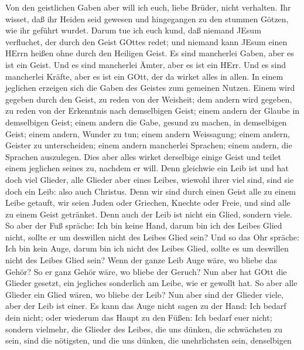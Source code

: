  Von den geistlichen Gaben aber will ich euch, liebe Brüder,
nicht verhalten.  Ihr wisset, daß ihr Heiden seid gewesen
und hingegangen zu den stummen Götzen, wie ihr geführt wurdet.
 Darum tue ich euch kund, daß niemand JEsum verfluchet, der
durch den Geist GOttes redet; und niemand kann JEsum einen HErrn heißen
ohne durch den Heiligen Geist.  Es sind mancherlei Gaben,
aber es ist ein Geist.  Und es sind mancherlei Ämter, aber
es ist ein HErr.  Und es sind mancherlei Kräfte, aber es ist
ein GOtt, der da wirket alles in allen.  In einem jeglichen
erzeigen sich die Gaben des Geistes zum gemeinen Nutzen. 
Einem wird gegeben durch den Geist, zu reden von der Weisheit; dem
andern wird gegeben, zu reden von der Erkenntnis nach demselbigen Geist;
 einem andern der Glaube in demselbigen Geist; einem andern
die Gabe, gesund zu machen, in demselbigen Geist;  einem
andern, Wunder zu tun; einem andern Weissagung; einem andern, Geister zu
unterscheiden; einem andern mancherlei Sprachen; einem andern, die
Sprachen auszulegen.  Dies aber alles wirket derselbige
einige Geist und teilet einem jeglichen seines zu, nachdem er will.
 Denn gleichwie ein Leib ist und hat doch viel Glieder,
alle Glieder aber eines Leibes, wiewohl ihrer viel sind, sind sie doch
ein Leib: also auch Christus.  Denn wir sind durch einen
Geist alle zu einem Leibe getauft, wir seien Juden oder Griechen,
Knechte oder Freie, und sind alle zu einem Geist getränket.
 Denn auch der Leib ist nicht ein Glied, sondern viele.
 So aber der Fuß spräche: Ich bin keine Hand, darum bin ich
des Leibes Glied nicht, sollte er um deswillen nicht des Leibes Glied
sein?  Und so das Ohr spräche: Ich bin kein Auge, darum bin
ich nicht des Leibes Glied, sollte es um deswillen nicht des Leibes
Glied sein?  Wenn der ganze Leib Auge wäre, wo bliebe das
Gehör? So er ganz Gehör wäre, wo bliebe der Geruch?  Nun
aber hat GOtt die Glieder gesetzt, ein jegliches sonderlich am Leibe,
wie er gewollt hat.  So aber alle Glieder ein Glied wären,
wo bliebe der Leib?  Nun aber sind der Glieder viele, aber
der Leib ist einer.  Es kann das Auge nicht sagen zu der
Hand: Ich bedarf dein nicht; oder wiederum das Haupt zu den Füßen: Ich
bedarf euer nicht;  sondern vielmehr, die Glieder des
Leibes, die uns dünken, die schwächsten zu sein, sind die nötigsten,
 und die uns dünken, die unehrlichsten sein, denselbigen
